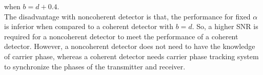 \documentclass[12pt]{report}
\begin{document}
	when $b = d + 0.4$.\\
	The disadvantage with noncoherent detector is that, the performance for fixed $\alpha$ is inferior when compared to a coherent detector with $b = d$. So,
	a higher SNR is required for a noncoherent detector to meet the performance of a coherent detector.
	However, a noncoherent	detector does not need to have the knowledge of carrier phase, whereas a coherent detector needs carrier phase tracking system to 
	synchronize the phases of the transmitter and receiver.


	
\end{document}
